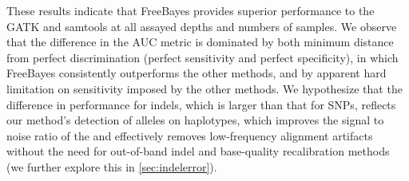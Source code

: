 \documentclass{article}
\begin{document}
These results indicate that FreeBayes provides superior performance to the GATK and samtools at all assayed depths and numbers of samples.
We observe that the difference in the AUC metric is dominated by both minimum distance from perfect discrimination (perfect sensitivity and perfect specificity), in which FreeBayes consistently outperforms the other methods, and by apparent hard limitation on sensitivity imposed by the other methods.  We hypothesize that the difference in performance for indels, which is larger than that for SNPs, reflects our method's detection of alleles on haplotypes, which improves the signal to noise ratio of the and effectively removes low-frequency alignment artifacts without the need for out-of-band indel and base-quality recalibration methods (we further explore this in \ref{sec:indelerror}).
\end{document}
